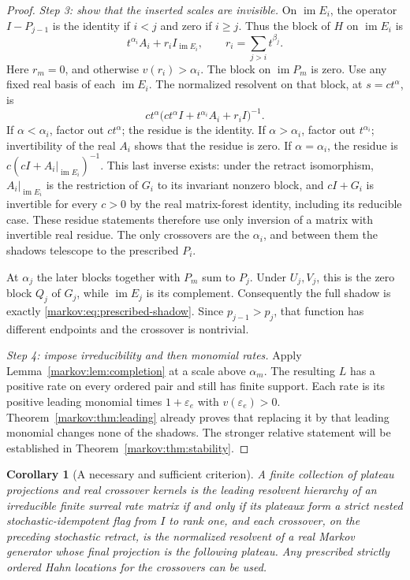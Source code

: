 \documentclass[11pt]{article}
\numberwithin{equation}{section}
\newtheorem{corollary}[theorem]{Corollary}
\theoremstyle{definition}
\theoremstyle{remark}
\newcommand{\im}{\operatorname{im}}
\begin{document}
\begin{proof}
\emph{Step 3: show that the inserted scales are invisible.}
On $\im E_i$, the operator $I-P_{j-1}$ is the identity if $i<j$ and zero if
$i\ge j$. Thus the block of $H$ on $\im E_i$ is
\begin{equation}\label{markov:eq:realization-block}
 t^{\alpha_i}A_i+r_i I_{\im E_i},\qquad
 r_i=\sum_{j>i}t^{\beta_j}.
\end{equation}
Here $r_m=0$, and otherwise $v(r_i)>\alpha_i$. The block on $\im P_m$ is zero.
Use any fixed real basis of each $\im E_i$. The normalized resolvent on that
block, at $s=ct^\alpha$, is
\[
 ct^\alpha\bigl(ct^\alpha I+t^{\alpha_i}A_i+r_iI\bigr)^{-1}.
\]
If $\alpha<\alpha_i$, factor out $ct^\alpha$; the residue is the identity.
If $\alpha>\alpha_i$, factor out $t^{\alpha_i}$; invertibility of the real
$A_i$ shows that the residue is zero. If $\alpha=\alpha_i$, the residue is
$c(cI+A_i|_{\im E_i})^{-1}$. This last inverse exists: under the retract
isomorphism, $A_i|_{\im E_i}$ is the restriction of $G_i$ to its invariant
nonzero block, and $cI+G_i$ is invertible for every $c>0$ by the real
matrix-forest identity, including its reducible case. These residue statements
therefore use only inversion of a matrix with invertible real residue. The only
crossovers are the
$\alpha_i$, and between them the shadows telescope to the prescribed $P_i$.

At $\alpha_j$ the later blocks together with $P_m$ sum to $P_j$. Under
$U_j,V_j$, this is the zero block $Q_j$ of $G_j$, while $\im E_j$ is its
complement. Consequently the full shadow is exactly
\eqref{markov:eq:prescribed-shadow}. Since $p_{j-1}>p_j$, that function has different
endpoints and the crossover is nontrivial.

\emph{Step 4: impose irreducibility and then monomial rates.}
Apply Lemma~\ref{markov:lem:completion} at a scale above $\alpha_m$. The resulting
$L$ has a positive rate on every ordered pair and still has finite support.
Each rate is its positive leading monomial times $1+\varepsilon_e$ with
$v(\varepsilon_e)>0$. Theorem~\ref{markov:thm:leading} already proves that replacing
it by that leading monomial changes none of the shadows. The stronger relative
statement will be established in Theorem~\ref{markov:thm:stability}.
\end{proof}

\begin{corollary}[A necessary and sufficient criterion]\label{markov:cor:classification}
A finite collection of plateau projections and real crossover kernels is the
leading resolvent hierarchy of an irreducible finite surreal rate matrix if and
only if its plateaux form a strict nested stochastic-idempotent flag from $I$ to
rank one, and each crossover, on the preceding stochastic retract, is the
normalized resolvent of a real Markov generator whose final projection is the
following plateau. Any prescribed strictly ordered Hahn locations for the
crossovers can be used.
\end{corollary}
\end{document}
